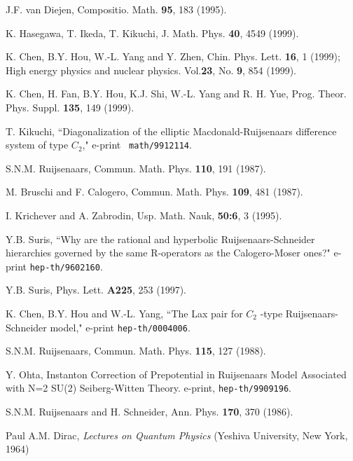 \documentclass[a4paper,12pt]{article}
\begin{document}
\begin{thebibliography}{99}
  J.F. van Diejen, Compositio. Math. \textbf{95}, 183 (1995).

  K. Hasegawa, T. Ikeda, T. Kikuchi, J. Math. Phys.
\textbf{40}, 4549 (1999).

	K. Chen, B.Y. Hou, W.-L. Yang and Y. Zhen, Chin. Phys.
Lett. \textbf{16}, 1 (1999); High energy physics and nuclear physics.
Vol.\textbf{23}, No. \textbf{9}, 854 (1999).

	K. Chen, H. Fan, B.Y. Hou, K.J. Shi, W.-L. Yang and R. H.
Yue, Prog. Theor. Phys. Suppl. \textbf{135}, 149 (1999).

  T. Kikuchi, ``Diagonalization of the elliptic
Macdonald-Ruijsenaars difference system of type $C_{2}$," e-print \texttt{%
math/9912114}.

  S.N.M. Ruijsenaars, Commun. Math. Phys. \textbf{110}, 191
(1987).

  M. Bruschi and F. Calogero, Commun. Math. Phys.
\textbf{109}, 481 (1987).

  I. Krichever and A. Zabrodin, Usp. Math. Nauk, \textbf{50:6}, 3
(1995).

  Y.B. Suris, ``Why are the rational and hyperbolic
Ruijsenaars-Schneider hierarchies governed by the same R-operators as the
Calogero-Moser ones?" e-print \texttt{hep-th/9602160}.

  Y.B. Suris, Phys. Lett. \textbf{A225}, 253 (1997).

	K. Chen, B.Y. Hou and W.-L. Yang, ``The Lax pair for $C_{2}$%
-type Ruijsenaars-Schneider model," e-print \texttt{hep-th/0004006}.

  S.N.M. Ruijsenaars, Commun. Math. Phys. \textbf{115},
127 (1988).

	Y. Ohta, Instanton Correction of Prepotential in
Ruijsenaars Model Associated with N=2 SU(2) Seiberg-Witten Theory. e-print,
\texttt{hep-th/9909196}.

  S.N.M. Ruijsenaars and H. Schneider, Ann. Phys.
\textbf{170}, 370 (1986).

	 Paul A.M. Dirac, \textsl{Lectures on Quantum Physics}%
(Yeshiva University, New York, 1964)
\end{thebibliography}
\end{document}
